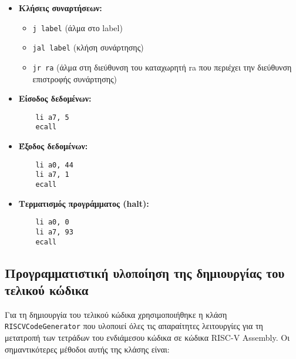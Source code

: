\documentclass[12pt,a4paper]{article}
\begin{document}
\begin{itemize}
    \item \textbf{Κλήσεις συναρτήσεων:}
    \begin{itemize}
        \item \texttt{j label} (άλμα στο label)
        \item \texttt{jal label} (κλήση συνάρτησης)
        \item \texttt{jr ra} (άλμα στη διεύθυνση του καταχωρητή ra που περιέχει την διεύθυνση επιστροφής συνάρτησης)
    \end{itemize}

    \item \textbf{Είσοδος δεδομένων:}
    \begin{verbatim}
    li a7, 5
    ecall
    \end{verbatim}

    \item \textbf{Έξοδος δεδομένων:}
    \begin{verbatim}
    li a0, 44
    li a7, 1
    ecall
    \end{verbatim}

    \item \textbf{Τερματισμός προγράμματος (halt):}
    \begin{verbatim}
    li a0, 0
    li a7, 93
    ecall
    \end{verbatim}
\end{itemize}

\subsection{Προγραμματιστική υλοποίηση της δημιουργίας του τελικού κώδικα}
Για τη δημιουργία του τελικού κώδικα χρησιμοποιήθηκε η κλάση \texttt{RISCVCodeGenerator} που υλοποιεί όλες τις απαραίτητες λειτουργίες για τη μετατροπή των τετράδων του ενδιάμεσου κώδικα σε κώδικα RISC-V Assembly. Οι σημαντικότερες μέθοδοι αυτής της κλάσης είναι:
\end{document}
